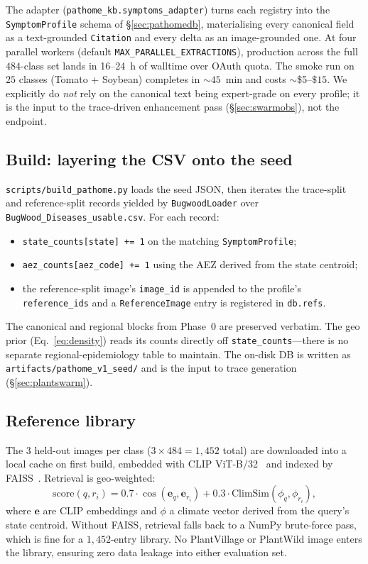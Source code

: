 \documentclass[11pt,twocolumn]{article}
\begin{document}
The adapter (\texttt{pathome\_kb.symptoms\_adapter})
turns each registry into the \texttt{SymptomProfile}
schema of \S\ref{sec:pathomedb}, materialising every
canonical field as a text-grounded \texttt{Citation}
and every delta as an image-grounded one.
At four parallel workers (default
\texttt{MAX\_PARALLEL\_EXTRACTIONS}), production
across the full $484$-class set lands in 16--24~h
of walltime over OAuth quota. The smoke run on
$25$ classes (Tomato + Soybean) completes in
$\sim$$45$~min and costs $\sim$\$5--$\$15$. We
explicitly do \emph{not} rely on the canonical
text being expert-grade on every profile; it is
the input to the trace-driven enhancement pass
(\S\ref{sec:swarmobs}), not the endpoint.

\subsection{Build: layering the CSV onto the seed}

\texttt{scripts/build\_pathome.py} loads the
seed JSON, then iterates the trace-split and
reference-split records yielded by
\texttt{BugwoodLoader} over
\texttt{BugWood\_Diseases\_usable.csv}. For
each record:
\begin{itemize}
  \item \texttt{state\_counts[state] += 1} on
    the matching \texttt{SymptomProfile};
  \item \texttt{aez\_counts[aez\_code] += 1}
    using the AEZ derived from the state
    centroid;
  \item the reference-split image's
    \texttt{image\_id} is appended to the
    profile's \texttt{reference\_ids} and
    a \texttt{ReferenceImage} entry is
    registered in \texttt{db.refs}.
\end{itemize}
The canonical and regional blocks from Phase~0
are preserved verbatim. The geo prior
(Eq.~\ref{eq:density}) reads its counts directly
off \texttt{state\_counts}---there is no separate
regional-epidemiology table to maintain.
The on-disk DB is written as
\texttt{artifacts/pathome\_v1\_seed/} and is
the input to trace generation
(\S\ref{sec:plantswarm}).

\subsection{Reference library}
\label{sec:refs}

The $3$ held-out images per class
($3 \times 484 = 1{,}452$ total) are downloaded
into a local cache on first build, embedded
with CLIP ViT-B/32~\citep{radford2021learning}
and indexed by FAISS~\citep{johnson2019billion}.
Retrieval is geo-weighted:
\begin{equation}
  \text{score}(q, r_i) =
  0.7\cdot\cos(\mathbf{e}_q, \mathbf{e}_{r_i})
  + 0.3\cdot\mathrm{ClimSim}(\phi_q, \phi_{r_i}),
  \label{eq:retrieval}
\end{equation}
where $\mathbf{e}$ are CLIP embeddings and
$\phi$ a climate vector derived from the query's
state centroid. Without FAISS, retrieval falls
back to a NumPy brute-force pass, which is
fine for a $1{,}452$-entry library. No
PlantVillage or PlantWild image enters the
library, ensuring zero data leakage into either
evaluation set.
\end{document}
